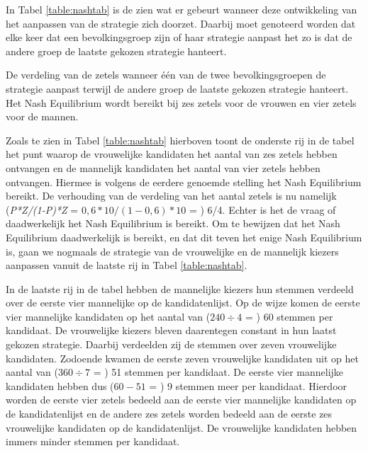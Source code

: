 In Tabel \ref{table:nashtab} is de zien wat er gebeurt wanneer deze ontwikkeling van het aanpassen van de strategie zich doorzet. Daarbij moet genoteerd worden dat elke keer dat een bevolkingsgroep zijn of haar strategie aanpast het zo is dat de andere groep de laatste gekozen strategie hanteert. 


\begin{table}[H]
\centering

		

			\caption{De verdeling van de zetels wanneer één van de twee bevolkingsgroepen de strategie aanpast terwijl de andere groep de laatste gekozen strategie hanteert. Het Nash Equilibrium wordt bereikt bij zes zetels voor de vrouwen en vier zetels voor de mannen.}
\label{table:nashtab} 
\end{table}

Zoals te zien in Tabel \ref{table:nashtab} hierboven toont de onderste rij in de tabel het punt waarop de vrouwelijke kandidaten het aantal van zes zetels hebben ontvangen en de mannelijk kandidaten het aantal van vier zetels hebben ontvangen. Hiermee is volgens de eerdere genoemde stelling het Nash Equilibrium bereikt. De verhouding van de verdeling van het aantal zetels is nu namelijk (\textit{P*Z/(1-P)*Z} = $0,6*10/(1-0,6)*10$ = ) 6/4. Echter is het de vraag of daadwerkelijk het Nash Equilibrium is bereikt. Om te bewijzen dat het Nash Equilibrium daadwerkelijk is bereikt, en dat dit teven het enige Nash Equilibrium is, gaan we nogmaals de strategie van de vrouwelijke en de mannelijk kiezers aanpassen vanuit de laatste rij in Tabel \ref{table:nashtab}. 

In de laatste rij in de tabel hebben de mannelijke kiezers hun stemmen verdeeld over de eerste vier mannelijke op de kandidatenlijst. Op de wijze komen de eerste vier mannelijke kandidaten op het aantal van ($240\div4$ = ) 60 stemmen per kandidaat. De vrouwelijke kiezers bleven daarentegen constant in hun laatst gekozen strategie. Daarbij verdeelden zij de stemmen over zeven vrouwelijke kandidaten. Zodoende kwamen de eerste zeven vrouwelijke kandidaten uit op het aantal van ($360\div7$ = ) 51 stemmen per kandidaat. De eerste vier mannelijke kandidaten hebben dus ($60-51$ = ) 9 stemmen meer per kandidaat. Hierdoor worden de eerste vier zetels bedeeld aan de eerste vier mannelijke kandidaten op de kandidatenlijst en de andere zes zetels worden bedeeld aan de eerste zes vrouwelijke kandidaten op de kandidatenlijst. De vrouwelijke kandidaten hebben immers minder stemmen per kandidaat. 


